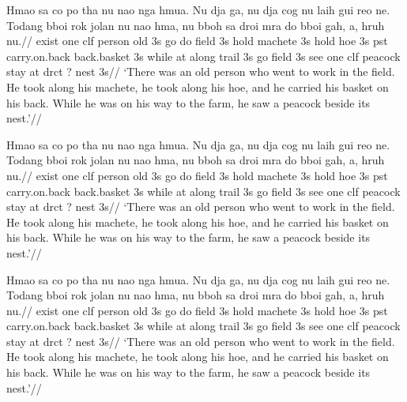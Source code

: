 \exdisplay\noexno
\begingl[glftpos=right]
[B]\quad \gla
Hmao sa co po tha  nu nao nga hmua. Nu dja ga, nu dja cog nu laih
gui reo ne. Todang bboi rok jolan nu nao hma, nu bboh sa droi mra
do bboi gah, a, hruh nu.//
\glb
exist one {clf} person old 3s go do field 3s hold machete 3s hold
hoe 3s pst carry.on.back back.basket 3s while at {along} trail 3s
go field 3s see one clf peacock stay at drct {?} nest 3s//
\glft
`There was an old person who went to work in the field. He took
along his machete, he took along his hoe, and he carried his
basket on his back. While he was on his way to the farm, he saw a
peacock beside its nest.'//
\endgl
\xe

\ex[glftpos=below]
\begingl
\gla
Hmao sa co po tha  nu nao nga hmua. Nu dja ga, nu dja cog nu laih
gui reo ne. Todang bboi rok jolan nu nao hma, nu bboh sa droi mra
do bboi gah, a, hruh nu.//
\glb
exist one {clf} person old 3s go do field 3s hold machete 3s hold
hoe 3s pst carry.on.back back.basket 3s while at {along} trail 3s
go field 3s see one clf peacock stay at drct {?} nest 3s//
\glft
`There was an old person who went to work in the field. He took
along his machete, he took along his hoe, and he carried his
basket on his back. While he was on his way to the farm, he saw a
peacock beside its nest.'//
\endgl
\xe


\ex[glftpos=right]
\begingl
\gla
Hmao sa co po tha  nu nao nga hmua. Nu dja ga, nu dja cog nu laih
gui reo ne. Todang bboi rok jolan nu nao hma, nu bboh sa droi mra
do bboi gah, a, hruh nu.//
\glb
exist one {clf} person old 3s go do field 3s hold machete 3s hold
hoe 3s pst carry.on.back back.basket 3s while at {along} trail 3s
go field 3s see one clf peacock stay at drct {?} nest 3s//
\glft
`There was an old person who went to work in the field. He took
along his machete, he took along his hoe, and he carried his
basket on his back. While he was on his way to the farm, he saw a
peacock beside its nest.'//
\endgl
\xe


\endinput
\bye

\ex[glftpos=below,glhangstyle=normal] \mkgloss\hmao \xe

\ex[glftpos=right,glhangstyle=normal] \mkgloss\hmao \xe

\ex[glftpos=below,glhangstyle=cascade] \mkgloss\hmao \xe

\ex[glftpos=right,glhangstyle=cascade,glhangindent=1em] \mkgloss\hmao \xe

\ex \mkgloss[glftpos=right,glhangstyle=cascade,glhangindent=1em]\hmao \xe


\noindent
\begingl
\gla
Hmao sa co po tha  nu nao nga hmua. Nu dja ga, nu dja cog nu laih
gui reo ne. Todang bboi rok jolan nu nao hma, nu bboh sa droi mra
do bboi gah, a, hruh nu.//
\glb
exist one {clf} person old 3s go do field 3s hold machete 3s hold
hoe 3s pst carry.on.back back.basket 3s while at {along} trail 3s
go field 3s see one clf peacock stay at drct {?} nest 3s//
\glft
`There was an old person who went to work in the field. He took
along his machete, he took along his hoe, and he carried his
basket on his back. While he was on his way to the farm, he saw a
peacock beside its nest.'//
\endgl


